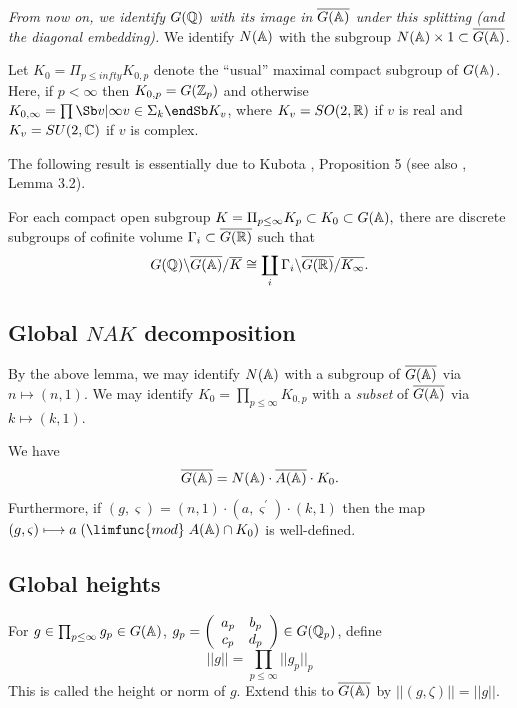{\em From now on, we identify $G({\Bbb{Q}})$ with its image
in $\overline{G({\Bbb{A}})}$ under this splitting (and the diagonal
embedding).} We identify $N({\Bbb{A}})$ with the
subgroup
$N({\Bbb{A}})\times 1\subset \overline{G({\Bbb{A}})}$.

Let $K_0=\Pi_{p\leq infty}K_{0,p}$
denote the ``usual'' maximal compact subgroup of $G({\Bbb{A}})$.
Here, if $p<\infty $ then $K_{0,p}=G({\Bbb Z}_p)$ and
otherwise
$K_{0,\infty}=\prod\Sb v|\infty\\ v\in\Sigma_k\endSb
K_v$, where $K_v=SO(2,{\Bbb{R}})$ if $v$ is real and
$K_v=SU(2,{\Bbb{C}})$ if $v$ is complex.

The following result is essentially due to Kubota \cite{K2},
Proposition 5 (see also \cite{Ge2}, Lemma 3.2).

\begin{lemma}
For each compact open subgroup $K=\Pi _{p\leq \infty }K_p\subset K_0\subset
G({\Bbb{A}}),$ there are discrete subgroups of cofinite volume $\Gamma
_i\subset \overline{G({\Bbb{R}})}$ such that 
\[
G({\Bbb Q})\backslash \overline{G({\Bbb{A}})}/\overline{K}
\cong \coprod_i
\Gamma _i\backslash \overline{G({\Bbb{R}})}/\overline{K_\infty }.
\]
\end{lemma}

\subsection{Global $NAK$ decomposition}

By the above lemma, we may identify $N({\Bbb{A}})$ with a subgroup of $%
\overline{G({\Bbb{A}})}$ via $n\longmapsto (n,1)$. We may identify $%
K_0=\prod_{p\leq \infty }K_{0,p}$ with a {\em subset} of
$\overline{G({\Bbb{A}})}$ via $k\longmapsto (k,1)$.

\begin{lemma}
We have 
\[
\overline{G({\Bbb{A}})}
=N({\Bbb{A}})\cdot \overline{A({\Bbb{A}})}\cdot K_0.
\]
Furthermore, if $(g,\varsigma )=(n,1)\cdot (a,\varsigma ^{\prime })\cdot
(k,1)$ then the map
$(g,\varsigma )\longmapsto a\;(\limfunc{mod}\;A({\Bbb{A}})\cap K_0)$
is well-defined.
\end{lemma}

\subsection{Global heights}

For $g\in \prod_{p\leq \infty }g_p\in G({\Bbb{A}})$,
$g_p=\left( 
\begin{array}{cc}
a_p & b_p \\ 
c_p & d_p
\end{array}
\right) \in G({\Bbb{Q}}_p)$, define 
\begin{equation}
||g||=\prod_{p\leq \infty }||g_p||_p
\end{equation}
This is called the height or norm of $g$. Extend this to
$\overline{G({\Bbb{A}})}$ by $||(g,\zeta)||=||g||$.

